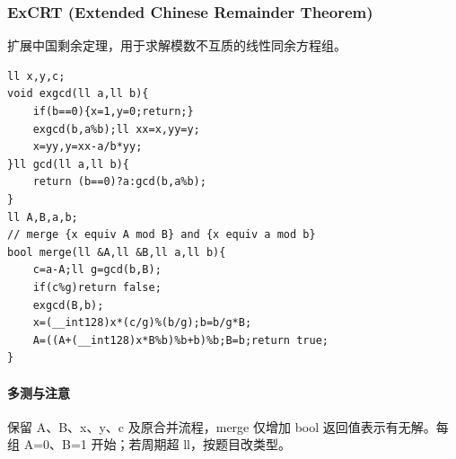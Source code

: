 \subsubsection{ExCRT (Extended Chinese Remainder Theorem)}
扩展中国剩余定理，用于求解模数不互质的线性同余方程组。
\begin{lstlisting}
ll x,y,c;
void exgcd(ll a,ll b){
	if(b==0){x=1,y=0;return;}
	exgcd(b,a%b);ll xx=x,yy=y;
	x=yy,y=xx-a/b*yy;
}ll gcd(ll a,ll b){
	return (b==0)?a:gcd(b,a%b);
}
ll A,B,a,b;
// merge {x equiv A mod B} and {x equiv a mod b}
bool merge(ll &A,ll &B,ll a,ll b){
    c=a-A;ll g=gcd(b,B);
    if(c%g)return false;
    exgcd(B,b);
    x=(__int128)x*(c/g)%(b/g);b=b/g*B;
    A=((A+(__int128)x*B%b)%b+b)%b;B=b;return true;
}
\end{lstlisting}

\paragraph{多测与注意} 保留 A、B、x、y、c 及原合并流程，merge 仅增加 bool 返回值表示有无解。每组 A=0、B=1 开始；若周期超 ll，按题目改类型。
